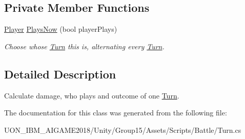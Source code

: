 \subsection*{Private Member Functions}
\begin{DoxyCompactItemize}
\item 
\mbox{\label{class_turn_a5dca683e4c9687227519db8872af3830}} 
\mbox{\hyperlink{class_player}{Player}} \mbox{\hyperlink{class_turn_a5dca683e4c9687227519db8872af3830}{Plays\+Now}} (bool player\+Plays)
\begin{DoxyCompactList}\small\item\em Choose whose \mbox{\hyperlink{class_turn}{Turn}} this is, alternating every \mbox{\hyperlink{class_turn}{Turn}}. \end{DoxyCompactList}\end{DoxyCompactItemize}


\subsection{Detailed Description}
Calculate damage, who plays and outcome of one \mbox{\hyperlink{class_turn}{Turn}}. 

The documentation for this class was generated from the following file\+:\begin{DoxyCompactItemize}
\item 
U\+O\+N\+\_\+\+I\+B\+M\+\_\+\+A\+I\+G\+A\+M\+E2018/\+Unity/\+Group15/\+Assets/\+Scripts/\+Battle/Turn.\+cs\end{DoxyCompactItemize}
